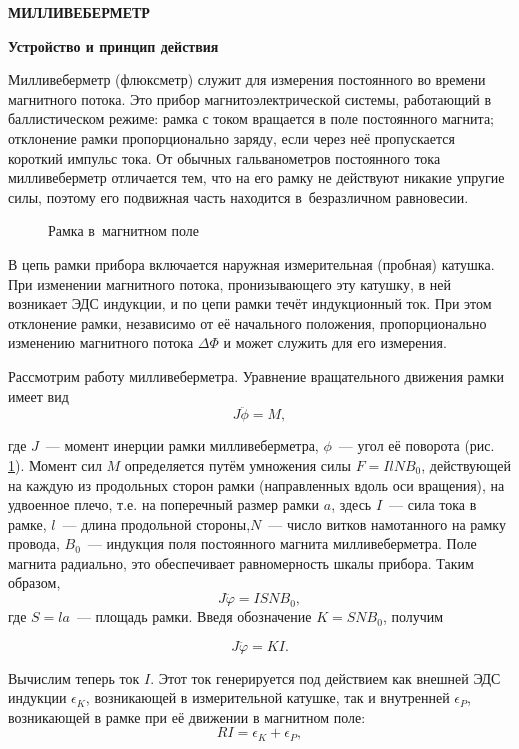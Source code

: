 \bigskip

\noindent\hfil{\large\bf  МИЛЛИВЕБЕРМЕТР}\label{MWB}

{\large\bf  Устройство и принцип действия}

Милливеберметр (флюксметр) служит для измерения постоянного во времени магнитного потока. Это прибор
магнитоэлектрической системы, работающий в баллистическом режиме: рамка с током вращается в поле постоянного магнита; отклонение рамки пропорционально заряду, если через неё пропускается короткий импульс тока. От обычных гальванометров постоянного тока милливеберметр отличается тем, что на его рамку не действуют никакие упругие силы, поэтому его подвижная часть находится в~безразличном равновесии.

\begin{figure}
\caption{Рамка в~магнитном поле}
\label{fig3.MWB.1}
\end{figure}

В цепь рамки прибора включается наружная измерительная (пробная) катушка. При изменении магнитного потока,
пронизывающего эту катушку, в ней возникает ЭДС индукции, и по цепи рамки течёт индукционный ток. При этом отклонение рамки, независимо от её начального положения, пропорционально изменению магнитного потока $\Delta\Phi$ и может служить для его измерения.

Рассмотрим работу милливеберметра. Уравнение вращательного движения рамки имеет вид
\begin{equation}
J\ddot{\phi}=M,
\label{eq3.MWB.1}
\end{equation}

где $J$~--- момент инерции рамки милливеберметра, $\phi$~--- угол её поворота (рис. \ref{fig3.MWB.1}). Момент сил $M$ определяется путём умножения силы $F=IlNB_0$, действующей на каждую из продольных сторон рамки (направленных вдоль оси вращения), на удвоенное плечо, т.е. на поперечный размер рамки $a$, здесь $I$~--- сила тока в рамке, $l$~--- длина продольной стороны,$N$~--- число витков намотанного на рамку провода, $B_0$~--- индукция поля постоянного магнита милливеберметра. Поле магнита радиально, это обеспечивает равномерность шкалы прибора. Таким образом,
$$
J\ddot{\varphi}=ISNB_0,
$$
где $S=la$~--- площадь рамки. Введя обозначение $K=SNB_0$, получим

\begin{equation}
J\ddot{\varphi}=KI.
\label{eq3.MWB.2}
\end{equation}

Вычислим теперь ток $I$. Этот ток генерируется под действием как внешней ЭДС индукции $\epsilon_K$, возникающей в измерительной катушке, так и внутренней $\epsilon_P$, возникающей в рамке при её движении в магнитном поле:
\begin{equation}
RI=\epsilon_K+\epsilon_P,
\label{eq3.MWB.3}
\end{equation}

